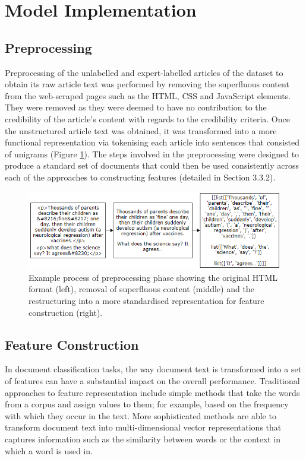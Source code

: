 \documentclass[a4paper,twoside,phd]{BYUPhys}
\begin{document}
\section{Model Implementation}
\label{sec:SystemModel}

\subsection{Preprocessing}
\label{sec:ModelPreprocessing}

Preprocessing of the unlabelled and expert-labelled articles of the dataset to obtain its raw article text was performed by removing the superfluous content from the web-scraped pages such as the HTML, CSS and JavaScript elements. They were removed as they were deemed to have no contribution to the credibility of the article's content with regards to the credibility criteria. Once the unstructured article text was obtained, it was transformed into a more functional representation via tokenising each article into sentences that consisted of unigrams (Figure \ref{fig:PreprocessingExample}). The steps involved in the preprocessing were designed to produce a standard set of documents that could then be used consistently across each of the approaches to constructing features (detailed in Section 3.3.2).

\begin{figure}[H]

	\includegraphics[width=16cm]{images/Preprocessing-example.png}
	\caption{Example process of preprocessing phase showing the original HTML format (left), removal of superfluous content (middle) and the restructuring into a more standardised representation for feature construction (right).}
	\label{fig:PreprocessingExample}
\end{figure}

\subsection{Feature Construction}
\label{sec:ModelFeatureConstruction}

In document classification tasks, the way document text is transformed into a set of features can have a substantial impact on the overall performance. Traditional approaches to feature representation include simple methods that take the words from a corpus and assign values to them; for example, based on the frequency with which they occur in the text. More sophisticated methods are able to transform document text into multi-dimensional vector representations that captures information such as the similarity between words or the context in which a word is used in.
\end{document}
